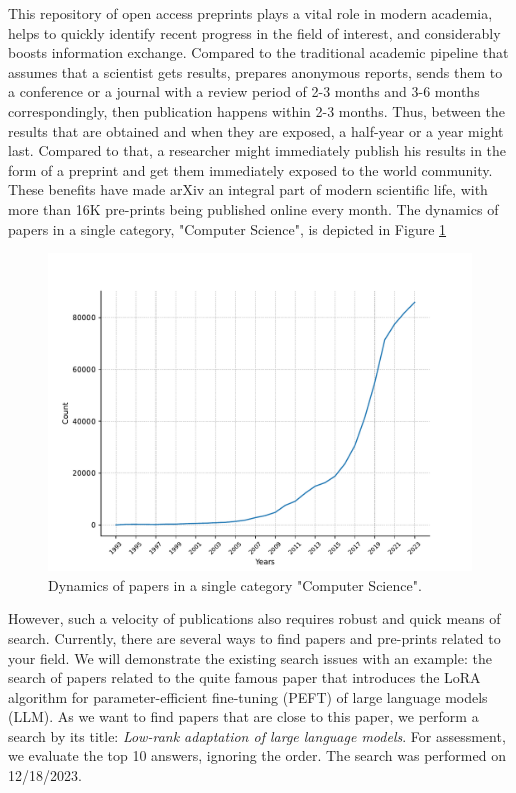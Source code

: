 \documentclass{article}
\begin{document}
    This repository of open access preprints plays a vital role in modern academia, helps to quickly identify recent progress in the field of interest, and considerably boosts information exchange. Compared to the traditional academic pipeline that assumes that a scientist gets results, prepares anonymous reports, sends them to a conference or a journal with a review period of 2-3 months and 3-6 months correspondingly, then publication happens within 2-3 months. Thus, between the results that are obtained and when they are exposed, a half-year or a year might last. Compared to that, a researcher might immediately publish his results in the form of a preprint and get them immediately exposed to the world community. These benefits have made arXiv an integral part of modern scientific life, with more than 16K pre-prints being published online every month. The dynamics of papers in a single category, "Computer Science", is depicted in Figure \ref{fig:cumulative}

    \begin{figure}[H]
        \centering
        \includegraphics[width=0.99\linewidth]{img/number_of_articles_in_years.pdf}
        \caption{Dynamics of papers in a single category "Computer Science".}
        \label{fig:cumulative}
    \end{figure}
    
    However, such a velocity of publications also requires robust and quick means of search. Currently, there are several ways to find papers and pre-prints related to your field. We will demonstrate the existing search issues with an example: the search of papers related to the quite famous paper \cite{hu2021lora} that introduces the LoRA algorithm for parameter-efficient fine-tuning (PEFT) of large language models (LLM). As we want to find papers that are close to this paper, we perform a search by its title: \textit{Low-rank adaptation of large language models}. For assessment, we evaluate the top 10 answers, ignoring the order. The search was performed on 12/18/2023.
    
\end{document}
